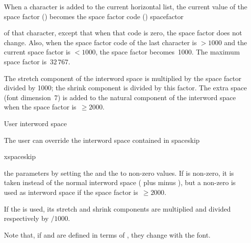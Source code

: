 When a character is added to the current
horizontal list, the current value of the space factor
() becomes the space factor code ()
\csterm spacefactor\par
of that character, except that when that code is zero, the
space factor does not change. Also, when the space factor code 
of the last character is
${>}1000$ and the current space factor is ${<}1000$, the space factor
becomes~1000.
The maximum space factor  is~$32\,767$.

The stretch component of the interword space is
multiplied by the space factor divided by 1000;
the shrink component is divided by this factor. 
The extra space (font dimension~7) is
added to the natural component of the
interword space when the space factor is~${}\geq2000$.

\point User interword space

The user can override the interword space contained in
\csterm spaceskip\par\csterm xspaceskip\par
the  parameters
by setting the
 and the  to non-zero values.
If  is non-zero, it is taken instead
of the normal interword space
( plus  minus ), but
a non-zero  is used as interword space if
the space factor is~${}\geq2000$.

If the  is used,
its stretch and shrink components are
multiplied and divided respectively by $/1000$.

Note that, if  and  are
defined in terms of , they change with the font.

